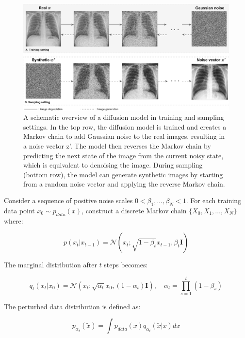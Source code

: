 \documentclass{article}
\begin{document}
\begin{figure}[htb]
    \centering
    \includegraphics[width=0.98\linewidth]{images/diffusion_model.pdf}
    \caption{A schematic overview of a diffusion model in training and sampling settings. In the top row, the diffusion model is trained and creates a Markov chain to add Gaussian noise to the real images, resulting in a noise vector z’. The model then reverses the Markov chain by predicting the next state of the image from the current noisy state, which is equivalent to denoising the image. During sampling (bottom row), the model can generate synthetic images by starting from a random noise vector and applying the reverse Markov chain.}
    \label{fig:diffusion_model_architecture}
\end{figure}

Consider a sequence of positive noise scales $0 < \beta_1, \dots, \beta_N < 1$. For each training data point $x_0 \sim p_{data}(x)$, construct a discrete Markov chain $\{X_0, X_1, \dots, X_N\}$ where:

\begin{equation}
p(x_t|x_{t-1}) = \mathcal{N}(x_t; \sqrt{1-\beta_t}x_{t-1}, \beta_t\mathbf{I})
\end{equation}

The marginal distribution after $t$ steps becomes:

\begin{equation}
q_t(x_t|x_0) = \mathcal{N}(x_t; \sqrt{\alpha_t}x_0, (1-\alpha_t)\mathbf{I}), \quad \alpha_t = \prod_{s=1}^t (1-\beta_s)
\end{equation}

The perturbed data distribution is defined as:

\begin{equation}
p_{\alpha_t}(\tilde{x}) = \int p_{data}(x)q_{\alpha_t}(\tilde{x}|x)dx
\end{equation}
\end{document}
